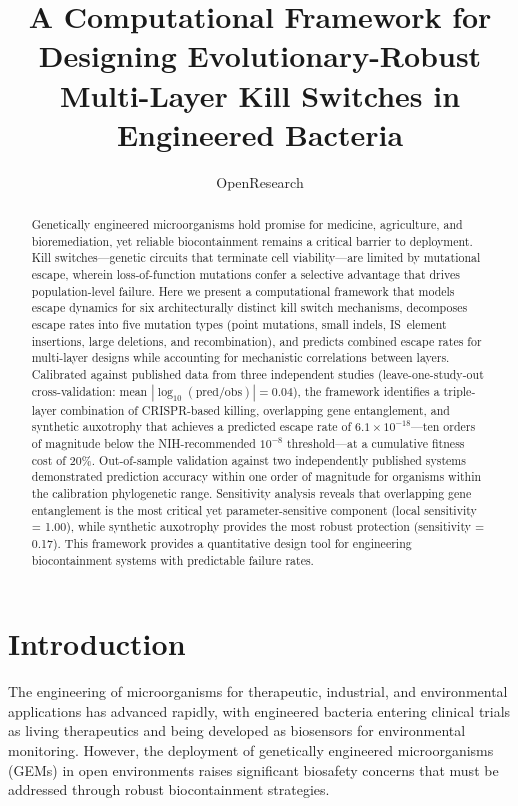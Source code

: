 \documentclass[journal=asbcd6,manuscript=article]{achemso}
\title{A Computational Framework for Designing Evolutionary-Robust Multi-Layer Kill Switches in Engineered Bacteria}
\author{OpenResearch}
\affiliation{OpenResearch, AI-Driven Scientific Discovery}
\begin{document}
\begin{abstract}
Genetically engineered microorganisms hold promise for medicine, agriculture, and bioremediation, yet reliable biocontainment remains a critical barrier to deployment. Kill switches---genetic circuits that terminate cell viability---are limited by mutational escape, wherein loss-of-function mutations confer a selective advantage that drives population-level failure. Here we present a computational framework that models escape dynamics for six architecturally distinct kill switch mechanisms, decomposes escape rates into five mutation types (point mutations, small indels, IS~element insertions, large deletions, and recombination), and predicts combined escape rates for multi-layer designs while accounting for mechanistic correlations between layers. Calibrated against published data from three independent studies (leave-one-study-out cross-validation: mean $|\log_{10}(\text{pred/obs})| = 0.04$), the framework identifies a triple-layer combination of CRISPR-based killing, overlapping gene entanglement, and synthetic auxotrophy that achieves a predicted escape rate of $6.1 \times 10^{-18}$---ten orders of magnitude below the NIH-recommended $10^{-8}$ threshold---at a cumulative fitness cost of 20\%. Out-of-sample validation against two independently published systems demonstrated prediction accuracy within one order of magnitude for organisms within the calibration phylogenetic range. Sensitivity analysis reveals that overlapping gene entanglement is the most critical yet parameter-sensitive component (local sensitivity = 1.00), while synthetic auxotrophy provides the most robust protection (sensitivity = 0.17). This framework provides a quantitative design tool for engineering biocontainment systems with predictable failure rates.
\end{abstract}

\section{Introduction}

The engineering of microorganisms for therapeutic, industrial, and environmental applications has advanced rapidly, with engineered bacteria entering clinical trials as living therapeutics\cite{Brennan2022} and being developed as biosensors for environmental monitoring. However, the deployment of genetically engineered microorganisms (GEMs) in open environments raises significant biosafety concerns that must be addressed through robust biocontainment strategies\cite{Pantoja2022,Stirling2020,Lei2022}.
\end{document}

